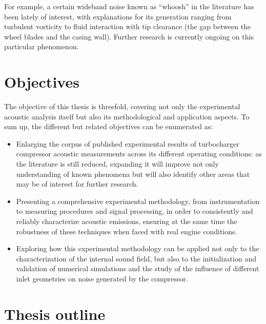 For example, a certain wideband noise known as ``whoosh'' in the literature has been lately of interest, with explanations for its generation ranging from turbulent vorticity to fluid interaction with tip clearance (the gap between the wheel blades and the casing wall). Further research is currently ongoing on this particular phenomenon.


\section{Objectives}

The objective of this thesis is threefold, covering not only the experimental acoustic analysis itself but also its methodological and application aspects. To sum up, the different but related objectives can be enumerated as:

\begin{itemize}
	\item Enlarging the corpus of published experimental results of turbocharger compressor acoustic measurements across its different operating conditions: as the literature is still reduced, expanding it will improve not only understanding of known phenomena but will also identify other areas that may be of interest for further research.

	\item Presenting a comprehensive experimental methodology, from instrumentation to measuring procedures and signal processing, in order to consistently and reliably characterize acoustic emissions, ensuring at the same time the robustness of these techniques when faced with real engine conditions.

	\item Exploring how this experimental methodology can be applied not only to the characterization of the internal sound field, but also to the initialization and validation of numerical simulations and the study of the influence of different inlet geometries on noise generated by the compressor.
\end{itemize}

\section{Thesis outline}

